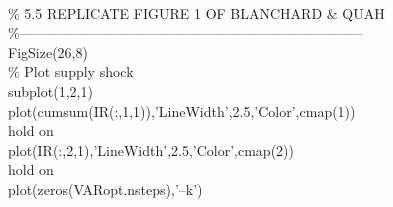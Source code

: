 \hspace{1mm}\hspace{5mm} \hspace{5mm}  \\ 
\hspace{1mm}\hspace{5mm} \hspace{5mm} \textcolor{matlabgreen}{\% 5.5 REPLICATE FIGURE 1 OF BLANCHARD \& QUAH }\\ 
\hspace{1mm}\hspace{5mm} \hspace{5mm} \textcolor{matlabgreen}{\%--------------------------------------------------------------------------  }\\ 
\hspace{1mm}\hspace{5mm} \hspace{5mm} FigSize(26,8) \\ 
\hspace{1mm}\hspace{5mm} \hspace{5mm} \textcolor{matlabgreen}{\% Plot supply shock }\\ 
\hspace{1mm}\hspace{5mm} \hspace{5mm} subplot(1,2,1) \\ 
\hspace{1mm}\hspace{5mm} \hspace{5mm} plot(cumsum(IR(:,1,1)),\textcolor{matlabpurple}{'LineWidth'},2.5,\textcolor{matlabpurple}{'Color'},cmap(1)) \\ 
\hspace{1mm}\hspace{5mm} \hspace{5mm} hold on \\ 
\hspace{1mm}\hspace{5mm} \hspace{5mm} plot(IR(:,2,1),\textcolor{matlabpurple}{'LineWidth'},2.5,\textcolor{matlabpurple}{'Color'},cmap(2)) \\ 
\hspace{1mm}\hspace{5mm} \hspace{5mm} hold on \\ 
\hspace{1mm}\hspace{5mm} \hspace{5mm} plot(zeros(VARopt.nsteps),\textcolor{matlabpurple}{'--k'}) \\ 
